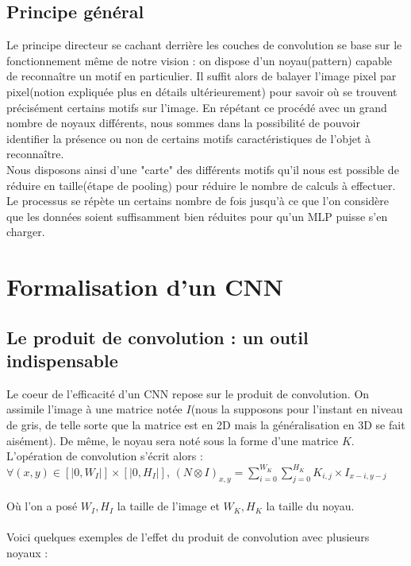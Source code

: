 \subsection{Principe général}
Le principe directeur se cachant derrière les couches de convolution se base sur le fonctionnement même de notre vision : on dispose d'un noyau(pattern) capable de reconnaître un motif en particulier. Il suffit alors de balayer l'image pixel par pixel(notion expliquée plus en détails ultérieurement) pour savoir où se trouvent précisément certains motifs sur l'image. En répétant ce procédé avec un grand nombre de noyaux différents, nous sommes dans la possibilité de pouvoir identifier la présence ou non de certains motifs caractéristiques de l'objet à reconnaître. \\
Nous disposons ainsi d'une "carte" des différents motifs qu'il nous est possible de réduire en taille(étape de pooling) pour réduire le nombre de calculs à effectuer. 
Le processus se répète un certains nombre de fois jusqu'à ce que l'on considère que les données soient suffisamment bien réduites pour qu'un MLP puisse s'en charger. 

\section{Formalisation d'un CNN}

\subsection{Le produit de convolution : un outil indispensable}

Le coeur de l'efficacité d'un CNN repose sur le produit de convolution. On assimile l'image à une matrice notée $I$(nous la supposons pour l'instant en niveau de gris, de telle sorte que la matrice est en 2D mais la généralisation en 3D se fait aisément). De même, le noyau sera noté sous la forme d'une matrice $K$.
L'opération de convolution s'écrit alors : \\

$\forall (x,y) \in [|0,W_I|] \times [|0,H_I|]$,  $(N \otimes I)_{x,y} = \sum_{i=0}^{W_K} \sum_{j=0}^{H_K} K_{i,j} \times I_{x-i,y-j}$ \\
\\
Où l'on a posé $W_I,H_I$ la taille de l'image et $W_K,H_K$ la taille du noyau. \\
\\
Voici quelques exemples de l'effet du produit de convolution avec plusieurs noyaux :

